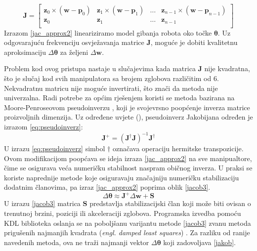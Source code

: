 \documentclass[times, utf8, diplomski, numeric]{fer}
\begin{document}
\begin{equation}
\mathbf{J} =
\begin{bmatrix}
\mathbf{z}_{0} \times (\mathbf{w} - \mathbf{p}_{0}) &\mathbf{z}_{1} \times (\mathbf{w} - \mathbf{p}_{1}) &\ldots &\mathbf{z}_{n-1} \times (\mathbf{w} - \mathbf{p}_{n-1})\\
\textbf{z}_{0} &\textbf{z}_{1} &\ldots &\textbf{z}_{n-1}\\
\end{bmatrix}
\label{jacob2}
\end{equation}
Izrazom \ref{jac_approx2} lineariziramo model gibanja robota oko točke $\bm{\theta}$. 
Uz odgovarajuću frekvenciju osvježavanja matrice $\mathbf{J}$, moguće je dobiti kvalitetnu aproksimaciju $\Delta \bm{\theta}$ za željeni $\Delta \mathbf{w}$.

Problem kod ovog pristupa nastaje u slučajevima kada matrica $\mathbf{J}$ nije kvadratna, što je slučaj kod svih manipulatora sa brojem zglobova različitim od 6.
Nekvadratnu matricu nije moguće invertirati, što znači da metoda nije univerzalna.
Radi potrebe za općim rješenjem koristi se metoda bazirana na Moore-Penroseovom pseudoinverzu \cite{klein1983review}, koji je svojevrsno poopćenje inverza matrice proizvoljnih dimenzija.
Uz određene uvjete (\cite{ben2003generalized}), pseudoinverz Jakobijana određen je izrazom \ref{eq:pseudoinverz}:
\begin{equation}
\mathbf{J}^{+} = \left( \mathbf{J}^{\dagger} \mathbf{J}\right)^{-1}\mathbf{J}^{\dagger}
\label{eq:pseudoinverz}
\end{equation}
U izrazu \ref{eq:pseudoinverz} simbol $\dagger$ označava operaciju hermitske transpozicije.
Ovom modifikacijom poopćava se ideja izraza \ref{jac_approx2} na sve manipualtore, čime se osigurava veća numeričku stabilnost naspram običnog inverza.
U praksi se koriste naprednije metode koje osiguravaju značajniju numeričku stabilizaciju dodatnim članovima, pa izraz \ref{jac_approx2} poprima oblik \ref{jacob3}.
\begin{equation}
\Delta \bm{\theta} \approx \mathbf{J}^{+} \Delta \textbf{w} + \mathbf{S}
\label{jacob3}
\end{equation}
U izrazu \ref{jacob3} matrica $\mathbf{S}$ predstavlja stabilizacijski član koji može biti ovisan o trenutnoj brzini, poziciji ili akceleraciji zglobova.
Programska izvedba pomoću KDL biblioteka oslanja se na poboljšanu varijantu metode \ref{jacob3} zvanu metoda prigušenih najmanjih kvadrata (\textit{engl. damped least squares}) \cite{buss2005selectively}.
Za razliku od ranije navedenih metoda, ova ne traži najmanji vektor $\Delta \bm{\theta}$ koji zadovoljava \ref{jakob}.
\end{document}
